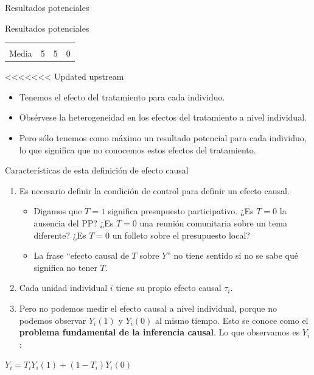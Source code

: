\documentclass[
  ignorenonframetext,
]{beamer}
\providecommand{\tightlist}{%
  \setlength{\itemsep}{0pt}\setlength{\parskip}{0pt}}
\begin{document}
\begin{frame}{Resultados potenciales}
\begin{frame}{Resultados potenciales}
\begin{table}[]
\begin{tabular}{cccc}
       &      &      &             \\ 

Media  & 5    & 5    & 0           \\ \hline
\end{tabular}
\end{table}
\end{frame}

<<<<<<< Updated upstream
\begin{itemize}
\item
  Tenemos el efecto del tratamiento para cada individuo.
\item
  Obsérvese la heterogeneidad en los efectos del tratamiento a nivel
  individual.
\item
  Pero sólo tenemos como máximo un resultado potencial para cada
  individuo, lo que significa que no conocemos estos efectos del
  tratamiento.
\end{itemize}
\end{frame}

\begin{frame}{Características de esta definición de efecto causal}
\protect\hypertarget{caracteruxedsticas-de-esta-definiciuxf3n-de-efecto-causal}{}
\begin{enumerate}
\tightlist
\item
  Es necesario definir la condición de control para definir un efecto
  causal.

  \begin{itemize}
  \tightlist
  \item
    Digamos que \(T=1\) significa presupuesto participativo. ¿Es \(T=0\)
    la ausencia del PP? ¿Es \(T=0\) una reunión comunitaria sobre un
    tema diferente? ¿Es \(T=0\) un folleto sobre el presupuesto local?
  \item
    La frase ``efecto causal de \(T\) sobre \(Y\)'' no tiene sentido si
    no se sabe qué significa no tener \(T\).
  \end{itemize}
\item
  Cada unidad individual \(i\) tiene su propio efecto causal \(\tau_i\).
\item
  Pero no podemos medir el efecto causal a nivel individual, porque no
  podemos observar \(Y_i(1)\) y \(Y_i(0)\) al mismo tiempo. Esto se
  conoce como el \textbf{problema fundamental de la inferencia causal}.
  Lo que observamos es \(Y_i\):
\end{enumerate}

\centering

\(Y_i = T_iY_i(1) + (1-T_i)Y_i(0)\)
\end{frame}
\end{document}
